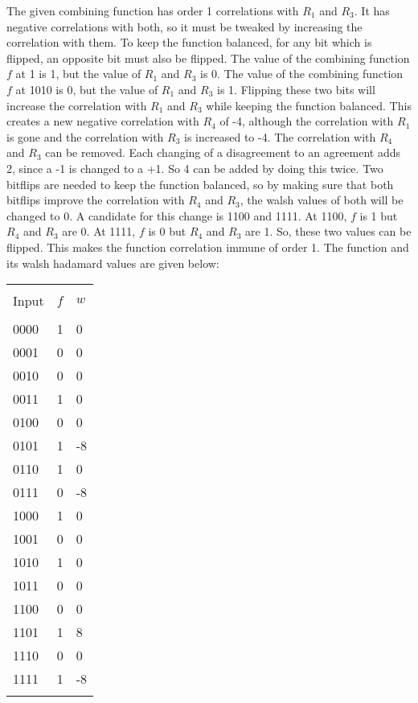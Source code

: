 \documentclass[british,11pt,a4paper]{article}
\begin{document}
The given combining function has order 1 correlations with \(R_1\) and \(R_3\).
It has negative correlations with both, so it must be tweaked by increasing
the correlation with them. To keep the function balanced, for any bit which
is flipped, an opposite bit must also be flipped. The value of the combining
function \(f\) at 1 is 1, but the value of \(R_1\) and \(R_3\) is 0. The
value of the combining function \(f\) at 1010 is 0, but the value of \(R_1\)
 and \(R_3\) is 1. Flipping these two bits will increase the correlation with
  \(R_1\) and \(R_3\) while keeping the function balanced. This creates a new
   negative correlation with \(R_4\) of -4, although the correlation with \(R_1\)
    is gone and the correlation with \(R_3\) is increased to -4. The correlation
    with \(R_4\) and \(R_3\) can be removed. Each changing of a disagreement to
  an agreement adds 2, since a -1 is changed to a +1. So 4 can be added by doing
  this twice. Two bitflips are needed to keep the function balanced, so by making
   sure that both bitflips improve the correlation with \(R_4\) and \(R_3\), the walsh values of both will be changed to 0. A candidate for this change is 1100 and 1111. At 1100, \(f\) is 1 but \(R_4\) and \(R_3\) are 0. At 1111, \(f\) is 0 but \(R_4\) and \(R_3\) are 1. So, these two values can be flipped. This makes the function correlation immune of order 1. The function and its walsh hadamard values are given below:
\begin{center}
  \begin{tabular}{@{}lll@{}}\label{tab:walsh2} \\
    \toprule \\
    Input & \(f\) & \(w\) \\
    \midrule \\
    0000 & 1 & 0 \\
    0001 & 0 & 0 \\
    0010 & 0 & 0 \\
    0011 & 1 & 0 \\
    0100 & 0 & 0 \\
    0101 & 1 & -8 \\
    0110 & 1 & 0 \\
    0111 & 0 & -8 \\
    1000 & 1 & 0 \\
    1001 & 0 & 0 \\
    1010 & 1 & 0 \\
    1011 & 0 & 0 \\
    1100 & 0 & 0 \\
    1101 & 1 & 8 \\
    1110 & 0 & 0 \\
    1111 & 1 & -8 \\
    \bottomrule \\
  \end{tabular}
\end{center}
\end{document}
